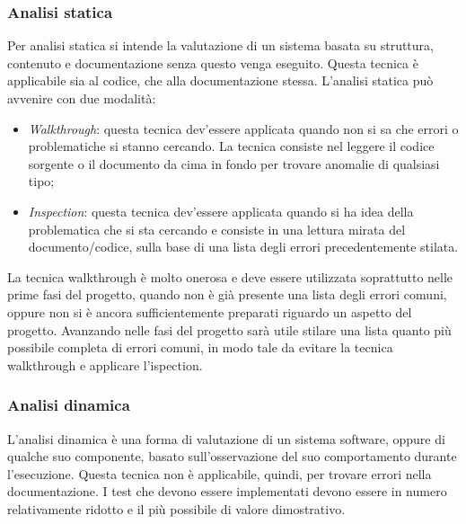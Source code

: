 \documentclass[../NormeProgetto.tex]{subfiles}
\begin{document}
			\subsubsection{Analisi statica} Per analisi statica si intende la valutazione di un sistema basata su struttura, contenuto e documentazione senza questo venga eseguito. Questa tecnica è applicabile sia al codice, che alla documentazione stessa. L'analisi statica può avvenire con due modalità:
			\begin{itemize}
				\item \textit{Walkthrough}: questa tecnica dev'essere applicata quando non si sa che errori o problematiche si stanno cercando. La tecnica consiste nel leggere il codice sorgente o il documento da cima in fondo per trovare anomalie  di qualsiasi tipo;
				\item \textit{Inspection}: questa tecnica dev'essere applicata quando si ha idea della problematica che si sta cercando e consiste in una lettura mirata del documento/codice, sulla base di una lista degli errori precedentemente stilata.
			\end{itemize}
			La tecnica walkthrough è molto onerosa e deve essere utilizzata soprattutto nelle prime fasi del progetto, quando non è già presente una lista degli errori comuni, oppure non si è ancora sufficientemente preparati riguardo un aspetto del progetto. Avanzando nelle fasi del progetto sarà utile stilare una lista quanto più possibile completa di errori comuni, in modo tale da evitare la tecnica walkthrough e applicare l'ispection.
			\subsubsection{Analisi dinamica}
			L’analisi dinamica è una forma di valutazione di un sistema software, oppure di qualche suo componente, basato sull'osservazione del suo comportamento durante l'esecuzione. Questa tecnica non è applicabile, quindi, per trovare errori nella documentazione. I test che devono essere implementati devono essere in numero relativamente ridotto e il più possibile di valore dimostrativo.
\end{document}
